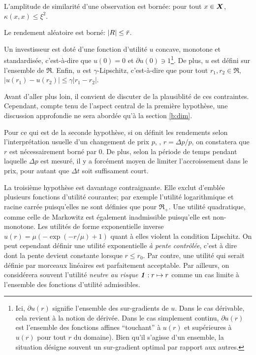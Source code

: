 \begin{assumption}
  L'amplitude de similarité d'une observation est bornée: pour tout $x \in \bm{X}$,
  $\kappa(x,x) \leq \xi^2$.
\end{assumption}
\begin{assumption}
  Le rendement aléatoire est borné: $|R| \leq \bar r$.
\end{assumption}
\begin{assumption}
  \label{hyp:lip}
  Un investisseur est doté d'une fonction d'utilité $u$ concave, monotone et standardisée,
  c'est-à-dire que $u(0) = 0$ et $\partial u(0) \ni 1$\footnote{Ici, $\partial u(r)$ signifie l'ensemble
    des sur-gradients de $u$. Dans le cas dérivable, cela revient à la notion de
    dérivée. Dans le cas simplement continu, $\partial u(r)$ est l'ensemble des fonctions affines
    ``touchant'' à $u(r)$ et supérieures à $u(r)$ pour tout $r$ du domaine). Bien qu'il
    s'agisse d'un ensemble, la situation désigne souvent un sur-gradient optimal par
    rapport aux autres.}. De plus, $u$ est défini sur l'ensemble de $\Re$. Enfin, $u$ est
  $\gamma$-Lipschitz, c'est-à-dire que pour tout $r_1,r_2 \in \Re$,
  $|u(r_1) - u(r_2)| \leq \gamma|r_1-r_2|$.
\end{assumption}

Avant d'aller plus loin, il convient de discuter de la plausiblité de ces
contraintes. Cependant, compte tenu de l'aspect central de la première hypothèse, une
discussion approfondie ne sera abordée qu'à la section \ref{b:dim}.

Pour ce qui est de la seconde hypothèse, si on définit les rendements selon
l'interprétation usuelle d'un changement de prix $p$, \ie, $r = \Delta p/p$, on constatera que
$r$ est nécessairement borné par 0. De plus, selon la période de temps pendant laquelle
$\Delta p$ est mesuré, il y a forcément moyen de limiter l'accroissement dans le prix, pour
autant que $\Delta t$ soit suffisament court.

La troisième hypothèse est davantage contraignante. Elle exclut d'emblée plusieurs
fonctions d'utilité courantes; par exemple l'utilité logarithmique et racine carrée
puisqu'elles ne sont définies que pour $\Re_{+}$. Une utilité quadratique, comme celle de
Markowitz est également inadmissible puisqu'elle est non-monotone. Les utilités de forme
exponentielle inverse $u(r) = \mu(-\exp(-r/\mu)+1)$ quant à elles violent la condition
Lipschitz. On peut cependant définir une utilité exponentielle \textit{à pente contrôlée},
c'est à dire dont la pente devient constante lorsque $r \leq r_0$. Par contre, une utilité
qui serait définie par morceaux linéaires est parfaitement acceptable. Par ailleurs, on
considérera souvent l'utilité \textit{neutre au risque} $\mbox{\textbf{\textit{1}}}: r \mapsto r$ comme un cas
limite à l'ensemble des fonctions d'utilité admissibles.

